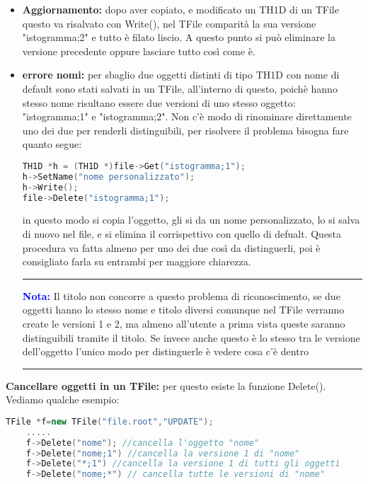 \begin{itemize}
	\item \textbf{Aggiornamento:} dopo aver copiato, e modificato un TH1D di un TFile questo va risalvato con Write(), nel TFile comparità la sua versione "istogramma;2" e tutto è filato liscio. A questo punto si può eliminare la versione precedente oppure lasciare tutto così come è.
	\item  \textbf{errore nomi:} per sbaglio due oggetti distinti di tipo TH1D con nome di default sono stati salvati in un TFile, all'interno di questo, poichè hanno stesso nome risultano essere due versioni di uno stesso oggetto: "istogramma;1" e "istogramma;2". Non c'è modo di rinominare direttamente uno dei due per renderli distinguibili, per risolvere il problema bisogna fare quanto segue:
\begin{lstlisting}[language=C++,label={cod1},mathescape=true,breaklines=true]
TH1D *h = (TH1D *)file->Get("istogramma;1");
h->SetName("nome personalizzato");
h->Write();
file->Delete("istogramma;1");
\end{lstlisting}
in questo modo si copia l'oggetto, gli si da un nome personalizzato, lo si salva di nuovo nel file, e si elimina il corrispettivo con quello di defualt. Questa procedura va fatta almeno per uno dei due così da distinguerli, poi è consigliato farla su entrambi per maggiore chiarezza.\\
{\color{blue} \rule{\linewidth}{0.5mm}}
\textcolor{blue}{\textbf{Nota:}} Il titolo non concorre a questo problema di riconoscimento, se due oggetti hanno lo stesso nome e titolo diversi comunque nel TFile verranno create le versioni 1 e 2, ma almeno all'utente a prima vista queste saranno distinguibili tramite il titolo. Se invece anche questo è lo stesso tra le versione dell'oggetto l'unico modo per distinguerle è vedere cosa c'è dentro\\
{\color{blue} \rule{\linewidth}{0.5mm}}
\end{itemize}

\textbf{Cancellare oggetti in un TFile:} per questo esiste la funzione Delete(). Vediamo qualche esempio:
\begin{lstlisting}[language=C++,label={cod1},mathescape=true,breaklines=true]
	TFile *f=new TFile("file.root","UPDATE");
	.....
	f->Delete("nome"); //cancella l'oggetto "nome"
	f->Delete("nome;1") //cancella la versione 1 di "nome"
	f->Delete("*;1") //cancella la versione 1 di tutti gli oggetti
	f->Delete("nome;*") // cancella tutte le versioni di "nome"
\end{lstlisting}

